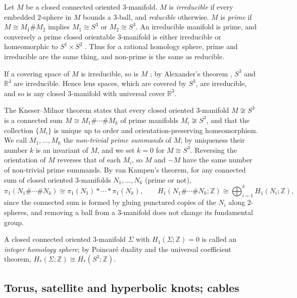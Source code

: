 \documentclass[12pt]{article}
\newcommand{\Z}{\mathbb Z}
\newcommand{\R}{\mathbb R}
\theoremstyle{definition}
\theoremstyle{remark}
\begin{document}
Let \(M\) be a closed connected oriented \(3\)-manifold. \(M\) is
\emph{irreducible} if every embedded \(2\)-sphere in \(M\) bounds a
\(3\)-ball, and \emph{reducible} otherwise. \(M\) is \emph{prime} if
\(M\cong M_1\#M_2\) implies \(M_1\cong S^3\) or \(M_2\cong S^3\). An
irreducible manifold is prime, and conversely a prime closed orientable
\(3\)-manifold is either irreducible or homeomorphic to \(S^1\times S^2\)
\cite[\S1.1]{Hatcher3M}. Thus for a rational homology sphere, prime and
irreducible are the same thing, and non-prime is the same as reducible.

If a covering space of \(M\) is irreducible, so is \(M\)
\cite[Proposition~1.6]{Hatcher3M}; by Alexander's theorem
\cite[\S1.1]{Hatcher3M}, \(S^3\) and \(\R^3\) are irreducible. Hence
lens spaces, which are covered by \(S^3\), are irreducible, and so is
any closed \(3\)-manifold with universal cover \(\R^3\).

The Kneser--Milnor theorem \cite[Theorem~1.5]{Hatcher3M} states that
every closed oriented \(3\)-manifold \(M\not\cong S^3\) is a connected sum
\(M\cong M_1\#\cdots\#M_k\) of prime manifolds \(M_i\not\cong S^3\), and
that the collection \(\{M_i\}\) is unique up to order and
orientation-preserving homeomorphism. We call \(M_1,\dots,M_k\) the
\emph{non-trivial prime summands} of \(M\); by uniqueness their number
\(k\) is an invariant of \(M\), and we set \(k=0\) for \(M\cong S^3\).
Reversing the orientation of \(M\) reverses that of each \(M_i\), so
\(M\) and \(-M\) have the same number of non-trivial prime summands.
By van Kampen's theorem, for any connected sum of closed oriented
\(3\)-manifolds \(N_1,\dots,N_k\) (prime or not),
\begin{equation}\label{eq:vk}
 \pi_1(N_1\#\cdots\#N_k)\cong\pi_1(N_1)*\cdots*\pi_1(N_k),
 \qquad
 H_1(N_1\#\cdots\#N_k;\Z)\cong\bigoplus_{i=1}^k H_1(N_i;\Z),
\end{equation}
since the connected sum is formed by gluing punctured copies of the
\(N_i\) along \(2\)-spheres, and removing a ball from a \(3\)-manifold
does not change its fundamental group.

A closed connected oriented \(3\)-manifold \(\Sigma\) with
\(H_1(\Sigma;\Z)=0\) is called an \emph{integer homology sphere}; by
Poincar\'e duality and the universal coefficient theorem,
\(H_*(\Sigma;\Z)\cong H_*(S^3;\Z)\).

\subsection{Torus, satellite and hyperbolic knots; cables}\label{sec:types}
\end{document}

